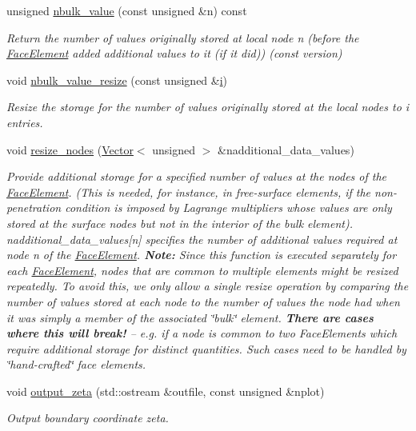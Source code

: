\begin{DoxyCompactItemize}
unsigned \hyperlink{classoomph_1_1FaceElement_a1045ac3ff9a56b0e4bd86b8e62f9d80c}{nbulk\+\_\+value} (const unsigned \&n) const
\begin{DoxyCompactList}\small\item\em Return the number of values originally stored at local node n (before the \hyperlink{classoomph_1_1FaceElement}{Face\+Element} added additional values to it (if it did)) (const version) \end{DoxyCompactList}\item 
void \hyperlink{classoomph_1_1FaceElement_afd5c80da03ec10df9887e57ee3bce773}{nbulk\+\_\+value\+\_\+resize} (const unsigned \&\hyperlink{cfortran_8h_adb50e893b86b3e55e751a42eab3cba82}{i})
\begin{DoxyCompactList}\small\item\em Resize the storage for the number of values originally stored at the local nodes to i entries. \end{DoxyCompactList}\item 
void \hyperlink{classoomph_1_1FaceElement_ae7513d0db79b9ec47f9d72f40dbb4417}{resize\+\_\+nodes} (\hyperlink{classoomph_1_1Vector}{Vector}$<$ unsigned $>$ \&nadditional\+\_\+data\+\_\+values)
\begin{DoxyCompactList}\small\item\em Provide additional storage for a specified number of values at the nodes of the \hyperlink{classoomph_1_1FaceElement}{Face\+Element}. (This is needed, for instance, in free-\/surface elements, if the non-\/penetration condition is imposed by Lagrange multipliers whose values are only stored at the surface nodes but not in the interior of the bulk element). {\ttfamily nadditional\+\_\+data\+\_\+values}\mbox{[}n\mbox{]} specifies the number of additional values required at node {\ttfamily n} of the \hyperlink{classoomph_1_1FaceElement}{Face\+Element}. {\bfseries Note\+:} Since this function is executed separately for each \hyperlink{classoomph_1_1FaceElement}{Face\+Element}, nodes that are common to multiple elements might be resized repeatedly. To avoid this, we only allow a single resize operation by comparing the number of values stored at each node to the number of values the node had when it was simply a member of the associated \char`\"{}bulk\char`\"{} element. {\bfseries There are cases where this will break!} -- e.\+g. if a node is common to two Face\+Elements which require additional storage for distinct quantities. Such cases need to be handled by \char`\"{}hand-\/crafted\char`\"{} face elements. \end{DoxyCompactList}\item 
void \hyperlink{classoomph_1_1FaceElement_adf2632a515afa6efdc884e6def8a4163}{output\+\_\+zeta} (std\+::ostream \&outfile, const unsigned \&nplot)
\begin{DoxyCompactList}\small\item\em Output boundary coordinate zeta. \end{DoxyCompactList}\end{DoxyCompactItemize}
